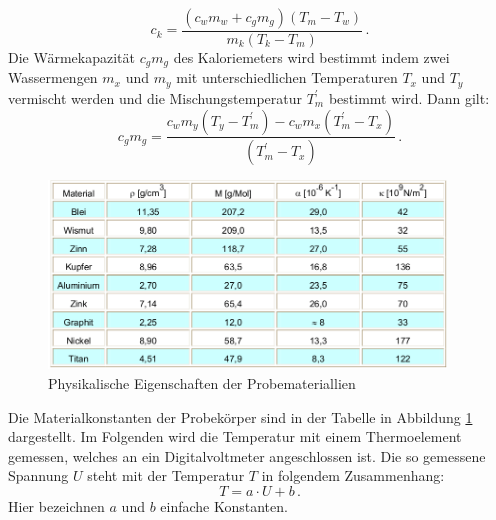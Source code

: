\begin{equation}
  c_k = \frac{(c_w m_w + c_g m_g)(T_m - T_w)}{m_k ( T_k - T_m)}\, .
  \label{eqn:ck}
\end{equation}
Die Wärmekapazität $c_g m_g$ des Kaloriemeters wird bestimmt indem zwei
Wassermengen $ m_x $ und $m_y$ mit unterschiedlichen Temperaturen $T_x$ und
$T_y$ vermischt werden und die Mischungstemperatur $T_m ^{'}$ bestimmt wird.
Dann gilt:
\begin{equation}
  c_gm_g = \frac{c_w m_y (T_y - T_m ^{'})- c_w m_x (T_m ^{'} - T_x)}{(T_m ^{'} - T_x)} \, .
  \label{eqn:cgmg}
\end{equation}
\begin{figure}
  \centering
  \includegraphics[height=5cm]{logos/tab.png}
  \caption{Physikalische Eigenschaften der Probemateriallien \cite{Anleitung}}
  \label{fig:tab}
\end{figure}
Die Materialkonstanten der Probekörper sind in der Tabelle in
Abbildung \ref{fig:tab} dargestellt.
Im Folgenden wird die Temperatur mit einem Thermoelement gemessen, welches
an ein Digitalvoltmeter angeschlossen ist. Die so gemessene Spannung $U$
steht mit der Temperatur $T$ in folgendem Zusammenhang:
\begin{equation}
  T = a\cdot U + b \,.
  \label{eqn:TU}
\end{equation}
Hier bezeichnen $ a $ und $b$ einfache Konstanten.


























%
